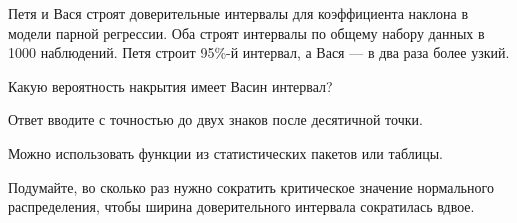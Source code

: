 
\begin{question}
Петя и Вася строят доверительные интервалы для коэффициента наклона в модели парной регрессии.
Оба строят интервалы по общему набору данных в 1000 наблюдений.
Петя строит 95\%-й интервал, а Вася --- в два раза более узкий.

Какую вероятность накрытия имеет Васин интервал?

Ответ вводите с точностью до двух знаков после десятичной точки.

Можно использовать функции из статистических пакетов или таблицы.
\end{question}

\begin{solution}
Подумайте, во сколько раз нужно сократить критическое значение нормального распределения, чтобы
ширина доверительного интервала сократилась вдвое.
\end{solution}


